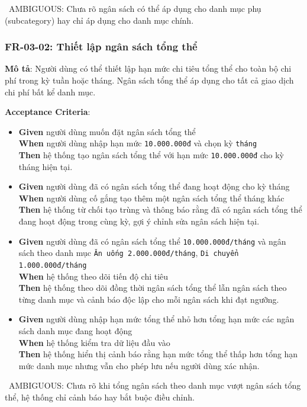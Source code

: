 \warningicon\  AMBIGUOUS: Chưa rõ ngân sách có thể áp dụng cho danh mục phụ (subcategory) hay chỉ áp dụng cho danh mục chính.



\subsubsection{FR-03-02: Thiết lập ngân sách tổng thể}

\textbf{Mô tả}: Người dùng có thể thiết lập hạn mức chi tiêu tổng thể cho toàn bộ chi phí trong kỳ tuần hoặc tháng. Ngân sách tổng thể áp dụng cho tất cả giao dịch chi phí bất kể danh mục.



\textbf{Acceptance Criteria}:

\begin{itemize}
\item \textbf{Given} người dùng muốn đặt ngân sách tổng thể  \\ \hspace*{1.5em}  \textbf{When} người dùng nhập hạn mức \texttt{10.000.000đ} và chọn kỳ \texttt{tháng}  \\ \hspace*{1.5em}  \textbf{Then} hệ thống tạo ngân sách tổng thể với hạn mức \texttt{10.000.000đ} cho kỳ tháng hiện tại.
\item \textbf{Given} người dùng đã có ngân sách tổng thể đang hoạt động cho kỳ tháng  \\ \hspace*{1.5em}  \textbf{When} người dùng cố gắng tạo thêm một ngân sách tổng thể tháng khác  \\ \hspace*{1.5em}  \textbf{Then} hệ thống từ chối tạo trùng và thông báo rằng đã có ngân sách tổng thể đang hoạt động trong cùng kỳ, gợi ý chỉnh sửa ngân sách hiện tại.
\item \textbf{Given} người dùng đã có ngân sách tổng thể \texttt{10.000.000đ/tháng} và ngân sách theo danh mục \texttt{Ăn uống 2.000.000đ/tháng}, \texttt{Di chuyển 1.000.000đ/tháng}  \\ \hspace*{1.5em}  \textbf{When} hệ thống theo dõi tiến độ chi tiêu  \\ \hspace*{1.5em}  \textbf{Then} hệ thống theo dõi đồng thời ngân sách tổng thể lẫn ngân sách theo từng danh mục và cảnh báo độc lập cho mỗi ngân sách khi đạt ngưỡng.
\item \textbf{Given} người dùng nhập hạn mức tổng thể nhỏ hơn tổng hạn mức các ngân sách danh mục đang hoạt động  \\ \hspace*{1.5em}  \textbf{When} hệ thống kiểm tra dữ liệu đầu vào  \\ \hspace*{1.5em}  \textbf{Then} hệ thống hiển thị cảnh báo rằng hạn mức tổng thể thấp hơn tổng hạn mức danh mục nhưng vẫn cho phép lưu nếu người dùng xác nhận.
\end{itemize}
\warningicon\  AMBIGUOUS: Chưa rõ khi tổng ngân sách theo danh mục vượt ngân sách tổng thể, hệ thống chỉ cảnh báo hay bắt buộc điều chỉnh.




